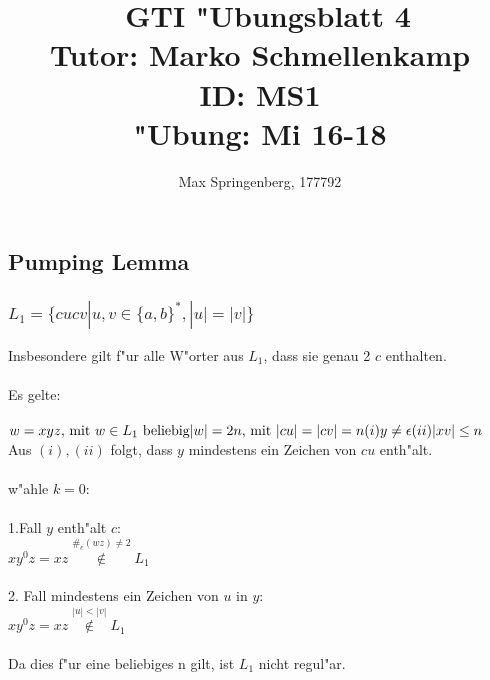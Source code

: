 \documentclass{article}
\author{Max Springenberg, 177792}
\title{\
    GTI "Ubungsblatt 4\\
    Tutor: Marko Schmellenkamp\\
    ID: MS1\\
    "Ubung: Mi 16-18
    }
\date{}
\newcommand{\eps}{\epsilon}
\begin{document}
\maketitle
\newpage

\subsection{Pumping Lemma}

\subsubsection{$L_1 = \{cucv | u,v \in \{a,b\}^*, |u| = |v|\}$}
Insbesondere gilt f"ur alle W"orter aus $L_1$, dass sie genau 2 $c$ enthalten.\\
\\
Es gelte:\\
\\
$w = xyz \text{, mit } w \in L_1 \text{ beliebig}\\
|w| = 2n \text{, mit } |cu| = |cv| = n\\
(i)     y \neq \eps\\
(ii)    |xv| \leq n\\$
\\
Aus $(i), (ii)$ folgt, dass $y$ mindestens ein Zeichen von $cu$ enth"alt.\\
\\
w"ahle $k=0$:\\
\\
1.Fall $y$ enth"alt $c$:\\
$xy^0z = xz \overset{\#_c(wz) \neq 2}{\not \in} L_1$\\
\\
2. Fall mindestens ein Zeichen von $u$ in $y$:\\
$xy^0z = xz \overset{|u| < |v|}{\not \in} L_1$\\
\\
Da dies f"ur eine beliebiges n gilt, ist $L_1$ nicht regul"ar.\\

\end{document}
